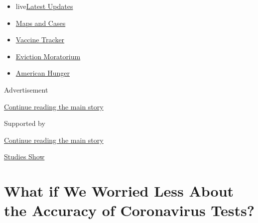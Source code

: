 \begin{itemize}
\tightlist
\item
  live\href{https://www.nytimes3xbfgragh.onion/2020/09/08/world/covid-19-coronavirus.html?name=styln-coronavirus-national\&region=TOP_BANNER\&block=storyline_menu_recirc\&action=click\&pgtype=Article\&impression_id=8eb19b31-f1cf-11ea-b346-6f5f5ea5e57a\&variant=undefined}{Latest
  Updates}
\item
  \href{https://www.nytimes3xbfgragh.onion/interactive/2020/us/coronavirus-us-cases.html?name=styln-coronavirus-national\&region=TOP_BANNER\&block=storyline_menu_recirc\&action=click\&pgtype=Article\&impression_id=8eb1c240-f1cf-11ea-b346-6f5f5ea5e57a\&variant=undefined}{Maps
  and Cases}
\item
  \href{https://www.nytimes3xbfgragh.onion/interactive/2020/science/coronavirus-vaccine-tracker.html?name=styln-coronavirus-national\&region=TOP_BANNER\&block=storyline_menu_recirc\&action=click\&pgtype=Article\&impression_id=8eb1c241-f1cf-11ea-b346-6f5f5ea5e57a\&variant=undefined}{Vaccine
  Tracker}
\item
  \href{https://www.nytimes3xbfgragh.onion/2020/09/02/your-money/eviction-moratorium-covid.html?name=styln-coronavirus-national\&region=TOP_BANNER\&block=storyline_menu_recirc\&action=click\&pgtype=Article\&impression_id=8eb1c242-f1cf-11ea-b346-6f5f5ea5e57a\&variant=undefined}{Eviction
  Moratorium}
\item
  \href{https://www.nytimes3xbfgragh.onion/interactive/2020/09/02/magazine/food-insecurity-hunger-us.html?name=styln-coronavirus-national\&region=TOP_BANNER\&block=storyline_menu_recirc\&action=click\&pgtype=Article\&impression_id=8eb1c243-f1cf-11ea-b346-6f5f5ea5e57a\&variant=undefined}{American
  Hunger}
\end{itemize}

Advertisement

\protect\hyperlink{after-top}{Continue reading the main story}

Supported by

\protect\hyperlink{after-sponsor}{Continue reading the main story}

\href{/column/studies-show}{Studies Show}

\hypertarget{what-if-we-worried-less-about-the-accuracy-of-coronavirus-tests}{%
\section{What if We Worried Less About the Accuracy of Coronavirus
Tests?}\label{what-if-we-worried-less-about-the-accuracy-of-coronavirus-tests}}

